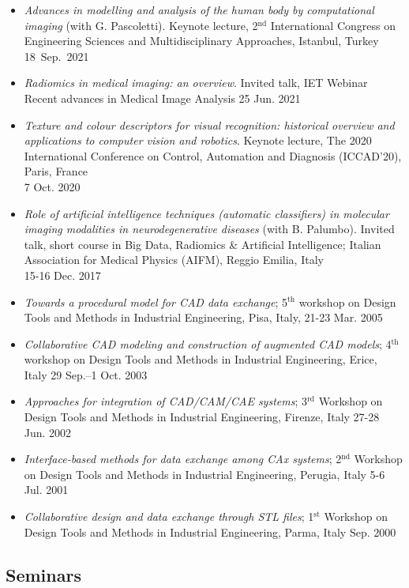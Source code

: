 \documentclass[11pt]{article}
\begin{document}
\begin{itemize}
	\item \emph{Advances in modelling and analysis of the human body by computational imaging} (with G. Pascoletti). Keynote lecture, 2$^\text{nd}$ International Congress on Engineering Sciences and Multidisciplinary Approaches, Istanbul, Turkey \hfill 18~Sep.~2021
	\item \emph{Radiomics in medical imaging: an overview}. Invited talk, IET Webinar Recent advances in Medical Image Analysis \hfill 25 Jun. 2021
	\item \emph{Texture and colour descriptors for visual recognition: historical overview and applications to computer vision and robotics}. Keynote lecture, The 2020 International Conference on Control, Automation and Diagnosis (ICCAD’20), Paris, France \\ \mbox{} \hfill 7 Oct. 2020
	\item \emph{Role of artificial intelligence techniques (automatic classifiers) in molecular imaging modalities in neurodegenerative diseases} (with B. Palumbo). Invited talk, short course in Big Data, Radiomics \& Artificial Intelligence; Italian Association for Medical Physics (AIFM), Reggio Emilia, Italy \\ \mbox{} \hfill 15-16 Dec. 2017
	\item \emph{Towards a procedural model for CAD data exchange}; 5$^\text{th}$ workshop on Design Tools and Methods in Industrial Engineering, Pisa, Italy, \hfill 21-23 Mar. 2005
	\item \emph{Collaborative CAD modeling and construction of augmented CAD models}; 4$^\text{th}$ workshop on Design Tools and Methods in Industrial Engineering, Erice, Italy \hfill 29 Sep.--1 Oct. 2003
	\item \emph{Approaches for integration of CAD/CAM/CAE systems}; 3$^\text{rd}$ Workshop on Design Tools and Methods in Industrial Engineering, Firenze, Italy \hfill 27-28 Jun. 2002
	\item \emph{Interface-based methods for data exchange among CAx systems}; 2$^\text{nd}$ Workshop on Design Tools and Methods in Industrial Engineering, Perugia, Italy \hfill 5-6 Jul. 2001
	\item \emph{Collaborative design and data exchange through STL files}; 1$^\text{st}$ Workshop on Design Tools and Methods in Industrial Engineering, Parma, Italy \hfill Sep. 2000
\end{itemize}

\subsection*{Seminars}
\end{document}
